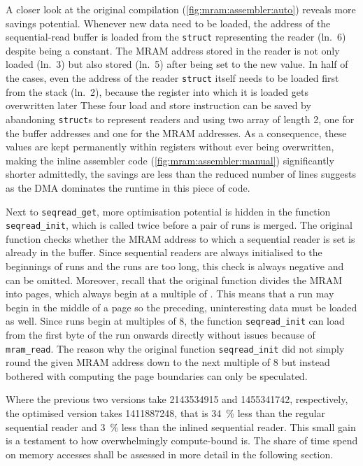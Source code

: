 A closer look at the original compilation (\cref{fig:mram:assembler:auto}) reveals more savings potential.
Whenever new data need to be loaded, the address of the sequential-read buffer is loaded from the \lstinline[keywords={}]|struct| representing the reader (ln.~6) despite being a constant.
The MRAM address stored in the reader is not only loaded (ln.~3) but also stored (ln.~5) after being set to the new value.
In half of the cases, even the address of the reader \lstinline[keywords={}]|struct| itself needs to be loaded first from the stack (ln.~2), because the register into which it is loaded gets overwritten later
These four load and store instruction can be saved by abandoning \lstinline[keywords={}]|struct|s to represent readers and using two array of length 2, one for the buffer addresses and one for the MRAM addresses.
As a consequence, these values are kept permanently within registers without ever being overwritten, making the inline assembler code (\cref{fig:mram:assembler:manual}) significantly shorter \Dash admittedly, the savings are less than the reduced number of lines suggests as the DMA dominates the runtime in this piece of code.

Next to \lstinline|seqread_get|, more optimisation potential is hidden in the function \lstinline|seqread_init|, which is called twice before a pair of runs is merged.
The original function checks whether the MRAM address to which a sequential reader is set is already in the buffer.
Since sequential readers are always initialised to the beginnings of runs and the runs are too long, this check is always negative and can be omitted.
Moreover, recall that the original function divides the MRAM into pages, which always begin at a multiple of \seqreadcachesize{}.
This means that a run may begin in the middle of a page so the preceding, uninteresting data must be loaded as well.
Since runs begin at multiples of 8, the function \lstinline|seqread_init| can load from the first byte of the run onwards directly without issues because of \lstinline|mram_read|.
The reason why the original function \lstinline|seqread_init| did not simply round the given MRAM address down to the next multiple of 8 but instead bothered with computing the page boundaries can only be speculated.

Where the previous two versions take \qty[exponent-mode=engineering, round-mode=places, round-precision=2]{2143534915}{\cycle} and \qty[exponent-mode=engineering, round-mode=places, round-precision=2]{1455341742}{\cycle}, respectively, the optimised version takes \qty[exponent-mode=engineering, round-mode=places, round-precision=2]{1411887248}{\cycle}, that is \qty{34}{\percent} less than the regular sequential reader and \qty{3}{\percent} less than the inlined sequential reader.
This small gain is a testament to how overwhelmingly compute-bound \MS{} is.
The share of time spend on memory accesses shall be assessed in more detail in the following section.
